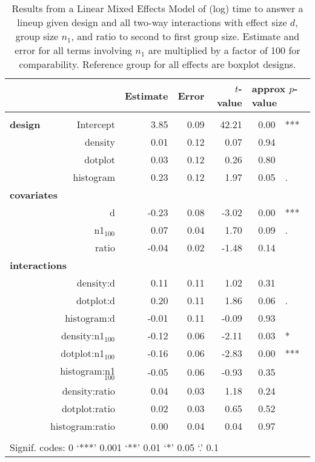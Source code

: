 \begin{table}[ht]
\begin{center}
\resizebox{\linewidth}{!} {
\begin{tabular}{lrrrrrl}
  \hline
& & Estimate & Error & $t$-value & \multicolumn{2}{l}{approx $p$-value} \\   \hline
\\[-8pt]
\bf design& Intercept & 3.85 & 0.09 & 42.21 & 0.00 & ***\\ 
&  density & 0.01 & 0.12 & 0.07 & 0.94 \\ 
&  dotplot & 0.03 & 0.12 & 0.26 & 0.80 \\ 
&  histogram & 0.23 & 0.12 & 1.97 & 0.05 & . \\ [2pt]
\multicolumn{2}{l}{\bf covariates}\\
&      d & -0.23 & 0.08 & -3.02 & 0.00 & ***\\ [1pt]
&    n1$_{100}$ & 0.07 & 0.04 & 1.70 & 0.09 & .\\ [1pt]
&  ratio & -0.04 & 0.02 & -1.48 & 0.14  \\ [2pt]
\multicolumn{2}{l}{\bf interactions}\\
&  density:d & 0.11 & 0.11 & 1.02 & 0.31 \\ 
&  dotplot:d & 0.20 & 0.11 & 1.86 & 0.06 & .  \\ 
&  histogram:d & -0.01 & 0.11 & -0.09 & 0.93 \\ [1pt]
&  density:n1$_{100}$ & -0.12 & 0.06 & -2.11 & 0.03 & *\\ 
&  dotplot:n1$_{100}$ & -0.16 & 0.06 & -2.83 & 0.00 & ***\\ 
&  histogram:n1$_{100}$ & -0.05 & 0.06 & -0.93 & 0.35 \\ [1pt]
&  density:ratio & 0.04 & 0.03 & 1.18 & 0.24 \\ 
&  dotplot:ratio & 0.02 & 0.03 & 0.65 & 0.52 \\ 
&  histogram:ratio & 0.00 & 0.04 & 0.04 & 0.97 \\ 
   \hline
\\[-5pt]
   \multicolumn{5}{l}{Signif. codes:  0 `***' 0.001 `**' 0.01 `*' 0.05 `.' 0.1}
\end{tabular}}
\end{center}
\caption{\label{tbl:speed2}Results from a Linear Mixed Effects Model of (log) time to answer a lineup given design and all two-way interactions with effect size $d$, group size $n_1$, and ratio to second to first group size. Estimate and error for all terms involving $n_1$ are multiplied by a factor of 100 for comparability.
Reference group for all effects are boxplot designs. }
\end{table}

